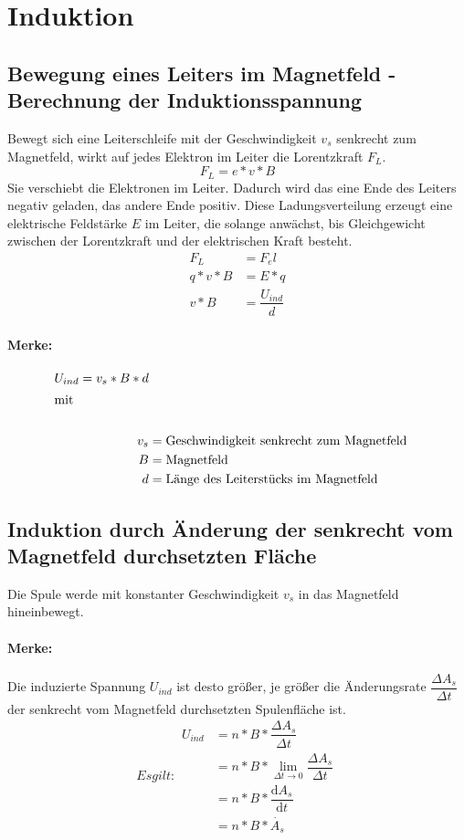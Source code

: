\section{Induktion}
	\subsection{Bewegung eines Leiters im Magnetfeld - Berechnung der Induktionsspannung}
	Bewegt sich eine Leiterschleife mit der Geschwindigkeit $v_s$ senkrecht zum Magnetfeld, wirkt auf jedes Elektron im Leiter die Lorentzkraft $F_L$.
	\begin{equation}
		F_L=e*v*B
	\end{equation}
	Sie verschiebt die Elektronen im Leiter. Dadurch wird das eine Ende des Leiters negativ geladen, das andere Ende positiv. Diese Ladungsverteilung erzeugt eine elektrische Feldstärke $E$ im Leiter, die solange anwächst, bis Gleichgewicht zwischen der Lorentzkraft und der elektrischen Kraft besteht.
		\begin{align}
		F_L&=F_el\nonumber\\
		q*v*B&=E*q\nonumber\\
		v*B&=\dfrac{U_{ind}}{d}\nonumber
		\end{align}
		\paragraph{Merke:}
		\begin{align}
		U_{ind}=v_s*B*d\\
		\intertext{mit}\nonumber\\
		v_s&=\text{Geschwindigkeit senkrecht zum Magnetfeld}\nonumber\\
		B&=\text{Magnetfeld}\nonumber\\
		d&=\text{Länge des Leiterstücks im Magnetfeld}\nonumber
		\end{align}	
	\subsection{Induktion durch Änderung der senkrecht vom Magnetfeld durchsetzten Fläche}
	Die Spule werde mit konstanter Geschwindigkeit $v_s$ in das Magnetfeld hineinbewegt.
	\paragraph{Merke:} Die induzierte Spannung $U_{ind}$ ist desto größer, je größer die Änderungsrate $\dfrac{\Delta A_s}{\Delta t}$ der senkrecht vom Magnetfeld durchsetzten Spulenfläche ist.
	\begin{subequations}
		Es gilt:
		\begin{align}
		U_{ind}&=n*B*\dfrac{\Delta A_s}{\Delta t}\nonumber\\
		&=n*B*\lim\limits_{\Delta t\rightarrow 0}  \dfrac{\Delta A_s}{\Delta t}\nonumber\\
		&=n*B*\dfrac{\mathrm{d} A_s}{\mathrm{d} t}\nonumber\\
		&=n*B*\dot{A_s}
		\end{align}
	\end{subequations}
